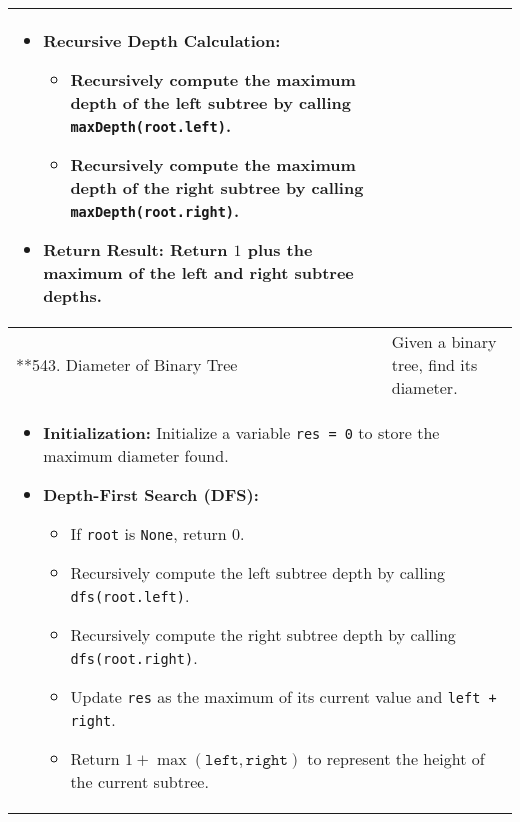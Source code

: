 \begin{summary}
\begin{center}
\begin{tabular}{ll}
{\begin{itemize}
\begin{itemize}
                        \item \textbf{Recursive Depth Calculation:}
                        \begin{itemize}
                            \item Recursively compute the maximum depth of the left subtree by calling \texttt{maxDepth(root.left)}.
                            \item Recursively compute the maximum depth of the right subtree by calling \texttt{maxDepth(root.right)}.
                        \end{itemize}
                    
                        \item \textbf{Return Result:} Return $1$ plus the maximum of the left and right subtree depths.
                    \end{itemize}
                \end{itemize}
            } \\
            \midrule
            **543. Diameter of Binary Tree & Given a binary tree, find its diameter. \\
            \multicolumn{2}{p{\linewidth}}{
                \begin{itemize}
                    \item \textbf{Initialization:} Initialize a variable \texttt{res = 0} to store the maximum diameter found.
                
                    \item \textbf{Depth-First Search (DFS):} 
                    \begin{itemize}
                        \item If \texttt{root} is \texttt{None}, return $0$.
                        \item Recursively compute the left subtree depth by calling \texttt{dfs(root.left)}.
                        \item Recursively compute the right subtree depth by calling \texttt{dfs(root.right)}.
                        \item Update \texttt{res} as the maximum of its current value and \texttt{left + right}.
                        \item Return $1 + \max(\texttt{left}, \texttt{right})$ to represent the height of the current subtree.
                    \end{itemize}
                

\end{itemize}}
\end{tabular}
\end{center}
\end{summary}
